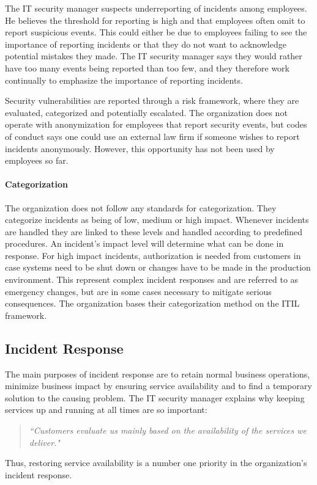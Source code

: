 The IT security manager suspects underreporting of incidents among employees. He believes the threshold for reporting is high and that employees often omit to report suspicious events. This could either be due to employees failing to see the importance of reporting incidents or that they do not want to acknowledge potential mistakes they made. The IT security manager says they would rather have too many events being reported than too few, and they therefore work continually to emphasize the importance of reporting incidents.

Security vulnerabilities are reported through a risk framework, where they are evaluated, categorized and potentially escalated. The organization does not operate with anonymization for employees that report security events, but codes of conduct says one could use an external law firm if someone wishes to report incidents anonymously. However, this opportunity has not been used by employees so far. 

\paragraph{Categorization}
The organization does not follow any standards for categorization. They categorize incidents as being of low, medium or high impact. Whenever incidents are handled they are linked to these levels and handled according to predefined procedures. An incident's impact level will determine what can be done in response. For high impact incidents, authorization is needed from customers in case systems need to be shut down or changes have to be made in the production environment. This represent complex incident responses and are referred to as emergency changes, but are in some cases necessary to mitigate serious consequences. The organization bases their categorization method on the ITIL framework.

\subsection{Incident Response}
The main purposes of incident response are to retain normal business operations, minimize business impact by ensuring service availability and to find a temporary solution to the causing problem. The IT security manager explains why keeping services up and running at all times are so important:

\begin{quote}
\textit{``Customers evaluate us mainly based on the availability of the services we deliver."}
\end{quote}
Thus, restoring service availability is a number one priority in the organization's incident response.

